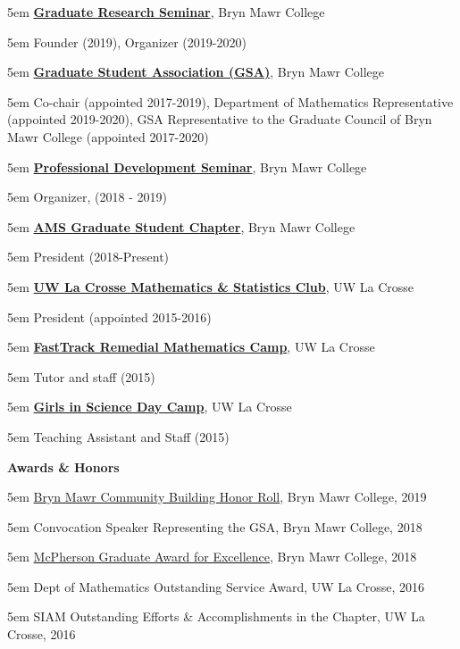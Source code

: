 \documentclass[10.5pt]{article}
\newcommand{\sectitle}[1]{{\large \textbf{#1}}\vspace{.5em}}
\newcommand{\itemreg}[1]{\begin{addmargin}[0em]{5em} #1 \end{addmargin}}
\newcommand{\itemregind}[1]{\begin{addmargin}[1em]{5em} #1 \end{addmargin}}
\begin{document}
\itemreg{\textbf{\href{}{Graduate Research Seminar}}, Bryn Mawr College}
	\itemregind{Founder (2019), Organizer (2019-2020)}
	\vspace{.25em}

\itemreg{\textbf{\href{https://www.brynmawr.edu/gsas/}{Graduate Student Association (GSA)}}, Bryn Mawr College}
	\itemregind{Co-chair (appointed 2017-2019), Department of Mathematics Representative (appointed 2019-2020), GSA Representative to the Graduate Council of Bryn Mawr College (appointed 2017-2020)}
	\vspace{.25em}
	
\itemreg{\textbf{\href{https://www.brynmawr.edu/ggsm}{Professional Development Seminar}}, Bryn Mawr College}
	\itemregind{Organizer, (2018 - 2019)}
	\vspace{.25em}
	
\itemreg{\textbf{\href{http://www.ams.org/programs/studentchapters}{AMS Graduate Student Chapter}}, Bryn Mawr College}
	\itemregind{President (2018-Present)}
	\vspace{.25em}
	
\itemreg{\textbf{\href{https://www.uwlax.edu/mathematics/activities/mathematics-and-stats-club/}{UW La Crosse Mathematics \& Statistics Club}}, UW La Crosse}
	\itemregind{President (appointed 2015-2016)}
	\vspace{.25em}

\itemreg{\textbf{\href{https://www.uwlax.edu/mathematics/fasttrack/}{FastTrack Remedial Mathematics Camp}}, UW La Crosse}
	\itemregind{Tutor and staff (2015)}
	\vspace{.25em}

\itemreg{\textbf{\href{https://www.uwlax.edu/conted/youth-programs/girls-in-science/welcome/}{Girls in Science Day Camp}}, UW La Crosse}
	\itemregind{Teaching Assistant and Staff (2015)}
\vspace{2em}



\clearpage



\sectitle{Awards \& Honors}

\itemregind{\href{https://www.brynmawr.edu/president/presidential-initiatives/community-belonging/community-building-honor-roll}{Bryn Mawr Community Building Honor Roll}, Bryn Mawr College, 2019}
	\vspace{.25em}
\itemregind{Convocation Speaker Representing the GSA, Bryn Mawr College, 2018}
	\vspace{.25em}
\itemregind{\href{https://www.brynmawr.edu/president/mcpherson-award-excellence}{McPherson Graduate Award for Excellence}, Bryn Mawr College, 2018}
	\vspace{.25em}
\itemregind{Dept of Mathematics Outstanding Service Award, UW La Crosse, 2016}
	\vspace{.25em}
\itemregind{SIAM Outstanding Efforts \& Accomplishments in the Chapter, UW La Crosse, 2016}
\vspace{2em}
\end{document}
